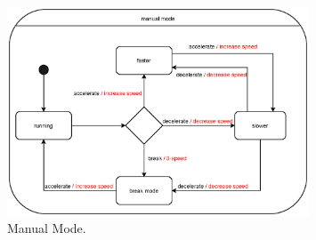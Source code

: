 \documentclass[12pt]{article}
\begin{document}
\begin{spacing}{1.5}
\begin{figure}[h!]
	\centering
		\includegraphics[width=0.8\textwidth]{./A2_Figures/A2_SOEN331_Manual.eps}
		  \caption{Manual Mode.}
  \label{fig:manual-mode-fig}
\end{figure}

\end{spacing}
\end{document}
